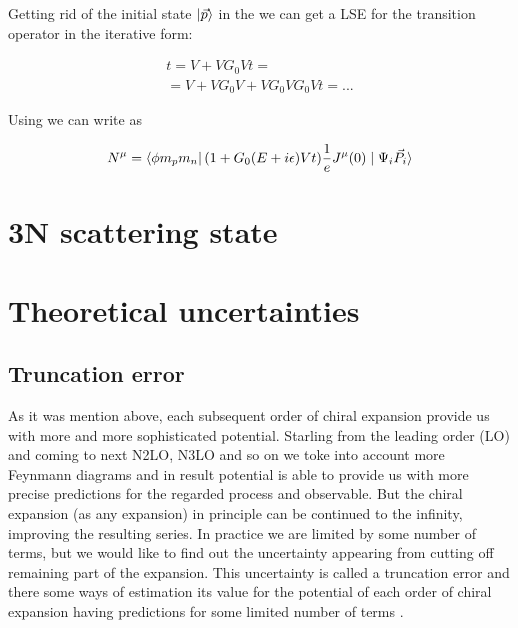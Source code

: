     Getting rid of the initial state $\ket{\vec{p}}$ in the  we can get a LSE
    for the transition operator in the iterative form:

    \begin{eqnarray}
        t = V + V G_0V t = \nonumber\\
        = V + V G_0 V + V G_0 V G_0V t = ...
    \end{eqnarray}

    Using  we can write  as
    
    \begin{equation}
        N^\mu = \bra{\phi m_p m_n} (1 + G_0(E + i\epsilon)V t) \frac{1}{e}J^\mu(0) \mid \Psi_i \vec{P_i} \rangle
        \label{main_top}
    \end{equation}

    
\section{3N scattering state}


\section{Theoretical uncertainties}
    
    \subsection*{Truncation error}

    As it was mention above, each subsequent order of chiral
    expansion provide us with more and more sophisticated
    potential. Starling from the leading order (LO) and coming to next
    N2LO, N3LO and so on we toke into account more Feynmann diagrams 
    and in result potential is able to provide us with more precise predictions
    for the regarded process and observable. But the chiral expansion (as any expansion) 
    in principle can be continued to the infinity, improving the resulting series.
    In practice we are limited by some number of terms, but we would like to find out
    the uncertainty appearing from cutting off remaining part of the expansion.
    This uncertainty is called a truncation error and there some ways of estimation its value
    for the potential of each order of chiral expansion having predictions for some limited number
    of terms \cite{Epelbaum2015_trunc, Epelbaum2014SCS, Binder2015, Epelbaum_pos}.

